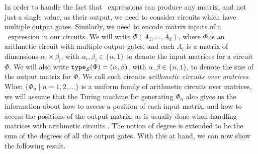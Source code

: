 

In order to handle the fact that \langfor\ expressions can produce any matrix, and not just a single value, as their output, we need to consider circuits which have multiple output gates. Similarly, we need to encode matrix inputs of a \langfor\ expression in our circuits. We will write $\Phi(A_1,\ldots ,A_k)$, where $\Phi$ is an arithmetic circuit with multiple output gates, and each $A_i$ is a matrix of dimensions $\alpha_i\times \beta_i$, with $\alpha_i,\beta_i \in \{n,1\}$ to denote the input matrices for a circuit $\Phi$. We will also write $\texttt{type}_{\mathcal{S}}(\Phi)=(\alpha,\beta)$, with $\alpha,\beta\in \{n,1\}$, to denote the size of the output matrix for $\Phi$. We call such circuits \textit{arithmetic circuits over matrices}. When $\{\Phi_n\mid n=1,2,\ldots\}$ is a uniform family of arithmetic circuits over matrices, we will assume that the Turing machine for generating $\Phi_n$ also gives us the information about how to access a position of each input matrix, and how to access the positions of the output matrix, as is usually done when handling matrices with arithmetic circuits \cite{Raz02}. The notion of degree is extended to be the sum of the degrees of all the output gates. With this  at hand, we can now show the following result.

